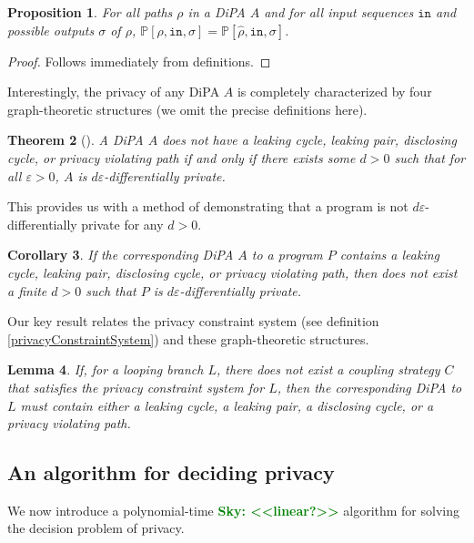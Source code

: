 \documentclass[12pt]{article}
\newcommand{\PP}{\mathbb{P}}
\newcommand{\todo}[2]{\textcolor{#1}{\textbf{#2}}}
\newcommand{\sky}[1]{\todo{green}{Sky: <<#1>>}}
\newtheorem{thm}{Theorem}[section]
\newtheorem{lemma}[thm]{Lemma}
\newtheorem{prop}[thm]{Proposition}
\newtheorem{cor}[thm]{Corollary}
\theoremstyle{definition}
\begin{document}
\begin{prop}
    For all paths $\rho$ in a DiPA $A$ and for all input sequences $\texttt{in}$ and possible outputs $\sigma$ of $\rho$, $\PP[\rho, \texttt{in}, \sigma] = \PP[\hat{\rho}, \texttt{in}, \sigma]$.
\end{prop}
\begin{proof}
    Follows immediately from definitions. 
\end{proof}


Interestingly, the privacy of any DiPA $A$ is completely characterized by four graph-theoretic structures (we omit the precise definitions here). 

\begin{thm}[\cite{chadhaLinearTimeDecidability2021}]\label{DiPACounterexamplesThm}
    A DiPA $A$ does not have a leaking cycle, leaking pair, disclosing cycle, or privacy violating path if and only if there exists some $d>0$ such that for all $\varepsilon>0$, $A$ is $d\varepsilon$-differentially private. 
\end{thm}

This provides us with a method of demonstrating that a program is not $d\varepsilon$-differentially private for any $d>0$.

\begin{cor}
    If the corresponding DiPA $A$ to a program $P$ contains a leaking cycle, leaking pair, disclosing cycle, or privacy violating path, then does not exist a finite $d>0$ such that $P$ is $d\varepsilon$-differentially private. 
\end{cor}

Our key result relates the privacy constraint system (see definition \ref{privacyConstraintSystem}) and these graph-theoretic structures.

\begin{lemma}
    If, for a looping branch $L$, there does not exist a coupling strategy $C$ that satisfies the privacy constraint system for $L$, then the corresponding DiPA to $L$ must contain either a leaking cycle, a leaking pair, a disclosing cycle, or a privacy violating path. 
\end{lemma}

\subsection{An algorithm for deciding privacy}

We now introduce a polynomial-time \sky{linear?} algorithm for solving the decision problem of privacy. 
\end{document}
